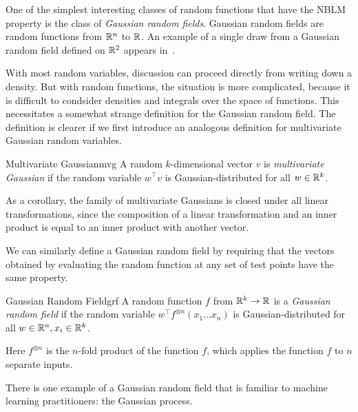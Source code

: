 \documentclass[../../thesis.tex]{subfiles}
\begin{document}
One of the simplest interesting classes of random functions
that have the NBLM property is the class of
\emph{Gaussian random fields}.
Gaussian random fields are random functions
from $\mathbb{R}^n$ to $\mathbb{R}$.
An example of a single draw from a Gaussian random field defined on $\mathbb{R}^2$
appears in~.

With most random variables,
discussion can proceed directly from writing down a density.
But with random functions,
the situation is more complicated,
because it is difficult to condsider densities and integrals over
the space of functions.
This necessitates a somewhat strange definition for the Gaussian random field.
The definition is clearer if we first introduce an analogous definition
for multivariate Gaussian random variables.

\begin{definition}{Multivariate Gaussian}{mvg}
	A random $k$-dimensional vector $v$ is \emph{multivariate Gaussian} if
	the random variable $w^\top v$ is Gaussian-distributed
	for all $w\in\mathbb{R}^k$.
\end{definition}
As a corollary,
the family of multivariate Gaussians is closed under all linear transformations,
since the composition of a linear transformation and an inner product
is equal to an inner product with another vector.

We can similarly define a Gaussian random field
by requiring that the vectors obtained by
evaluating the random function at any set of test points
have the same property.
\begin{definition}{Gaussian Random Field}{grf}
	A random function $f$ from $\mathbb{R}^k\to\mathbb{R}$ is a \emph{Gaussian random field}
	if the random variable $w^\top f^{\otimes n}(x_1 \dots x_n)$
	is Gaussian-distributed
	for all $w\in\mathbb{R}^n, x_i \in\mathbb{R}^k$.
\end{definition}
Here $f^{\otimes n}$ is the $n$-fold product of the function $f$,
which applies the function $f$ to $n$ separate inputs.

There is one example of a Gaussian random field
that is familiar to machine learning practitioners:
the Gaussian process.
\end{document}
